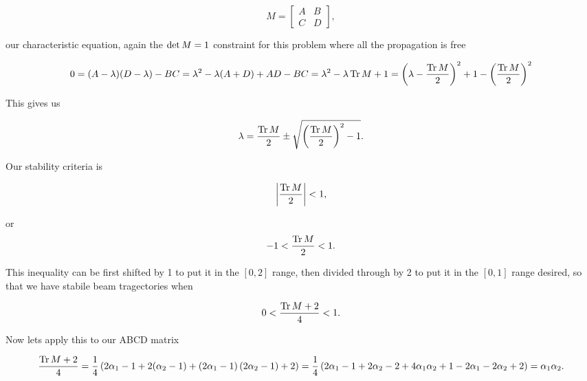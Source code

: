 {\begin{equation}\label{eqn:problemSet4Problem2:920}
M =
\begin{bmatrix}
A & B \\
C & D
\end{bmatrix},
\end{equation}

our characteristic equation, again the $\operatorname{det} M = 1$ constraint for this problem where all the propagation is free

\begin{dmath}\label{eqn:problemSet4Problem2:940}
0
= (A - \lambda)(D - \lambda) - B C
= \lambda^2 - \lambda( A + D ) + A D - BC
= \lambda^2 - \lambda \tr M + 1
= \left(\lambda - \frac{\tr M}{2}\right)^2 + 1 - \left(\frac{\tr M}{2}\right)^2
\end{dmath}

This gives us

\begin{dmath}\label{eqn:problemSet4Problem2:960}
\lambda =
\frac{\tr M}{2} \pm \sqrt{ \left(\frac{\tr M}{2}\right)^2 - 1 }.
\end{dmath}

Our stability criteria is

\begin{dmath}\label{eqn:problemSet4Problem2:980}
\Abs{ \frac{\tr M}{2} } < 1,
\end{dmath}

or
\begin{equation}\label{eqn:problemSet4Problem2:1000}
-1 < \frac{\operatorname{Tr} M}{2} < 1.
\end{equation}

This inequality can be first shifted by 1 to put it in the $[0,2]$ range, then divided through by 2 to put it in the $[0, 1]$ range desired, so that we have stabile beam tragectories when

\begin{equation}\label{eqn:problemSet4Problem2:1020}
0 < \frac{\operatorname{Tr} M + 2 }{4} < 1.
\end{equation}

Now lets apply this to our ABCD matrix

\begin{dmath}\label{eqn:problemSet4Problem2:1040}
\frac{\tr M + 2 }{4}
=
\inv{4}
\left(
2 \alpha_1 - 1
+
2(\alpha_2 - 1) +
\left(
2 \alpha_1 - 1
\right)
\left(
2 \alpha_2 - 1
\right)
+ 2
\right)
=
\inv{4}
\left(
2 \alpha_1 - 1
+
2 \alpha_2 - 2 +
4 \alpha_1 \alpha_2 + 1 - 2 \alpha_1 - 2 \alpha_2
+ 2
\right)
=
\alpha_1 \alpha_2.
\end{dmath}

}
